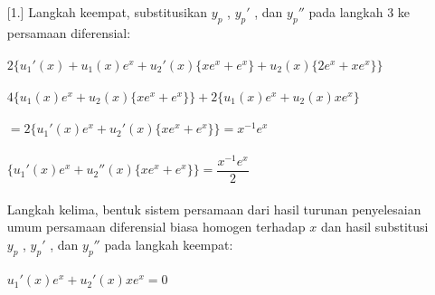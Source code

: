 \begin{enumerate} [1.]
	Langkah keempat, substitusikan \begin{math} y_p \end{math} , \begin{math} y_p ' \end{math} , dan \begin{math} y_p '' \end{math} pada langkah 3 ke persamaan diferensial: \\ \\
	\begin{math} 2 \big\{ u_1 ' (x) + u_1 (x) e^{x} + u_2 ' (x) \big\{ xe^{x} + e^{x} \big\}  + u_2 (x) \big\{ 2e^{x} + xe^{x} \big\} \big\} \end{math} \\ \\
	\begin{math} 4 \big\{ u_1 (x) e^{x} + u_2 (x) \big\{ xe^{x} + e^{x} \big\} \big\} + 2 \big\{ u_1 (x) e^{x} + u_2 (x) xe^{x} \big\} \end{math} \\ \\
	\begin{math} = 2 \big\{ u_1 ' (x) e^{x} + u_2 ' (x) \big\{ xe^{x} + e^{x} \big\} \big\} = x^{-1} e^{x} \end{math} \\ \\
	\begin{math} \big\{ u_1 ' (x) e^{x} + u_2 '' (x) \big\{ xe^{x} + e^{x} \big\} \big\} = \dfrac{ x^{-1} e^{x}}{2} \end{math} \\ \\
	Langkah kelima, bentuk sistem persamaan dari hasil  turunan penyelesaian umum persamaan diferensial biasa homogen terhadap \begin{math} x \end{math} dan hasil substitusi \begin{math} y_p \end{math} , \begin{math} y_p ' \end{math} , dan \begin{math} y_p '' \end{math} pada langkah keempat: \\ \\
	\begin{math} u_1 '(x) e^{x} + u_2 ' (x) xe^{x} = 0 \end{math} \\ \\

\end{enumerate}
